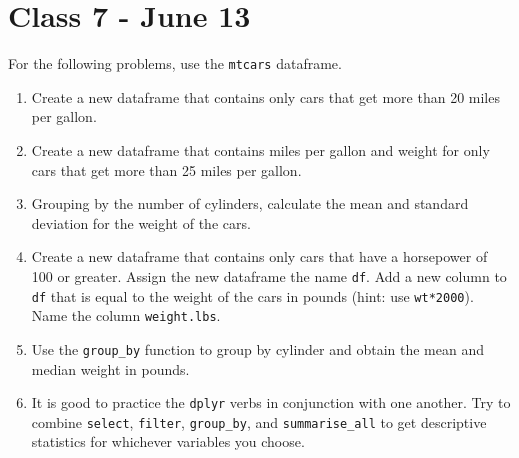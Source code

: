 \documentclass[letterpaper,12pt]{article}
\begin{document}
\section{Class 7 - June 13}

For the following problems, use the \verb|mtcars| dataframe.

\begin{enumerate}
    \item Create a new dataframe that contains only cars that get more than 20 miles per gallon.
    \item Create a new dataframe that contains miles per gallon and weight for only cars that get more than 25 miles per gallon. 
    \item Grouping by the number of cylinders, calculate the mean and standard deviation for the weight of the cars.
    \item Create a new dataframe that contains only cars that have a horsepower of 100 or greater. Assign the new dataframe the name \verb|df|. Add a new column to \verb|df| that is equal to the weight of the cars in pounds (hint: use \verb|wt*2000|). Name the column \verb|weight.lbs|.
    \item Use the \verb|group_by| function to group by cylinder and obtain the mean and median weight in pounds. 
    \item It is good to practice the \verb|dplyr| verbs in conjunction with one another. Try to combine \verb|select|, \verb|filter|, \verb|group_by|, and \verb|summarise_all| to get descriptive statistics for whichever variables you choose. 
\end{enumerate}
\end{document}

